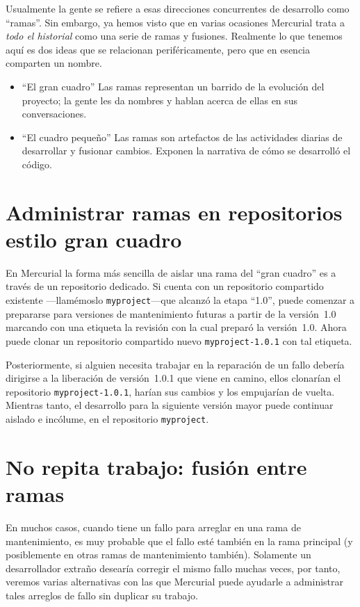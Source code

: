 Usualmente la gente se refiere a esas direcciones
concurrentes de desarrollo como ``ramas''.  Sin embargo, ya hemos visto que
en varias ocasiones Mercurial trata a \emph{todo el historial} como
una serie de ramas y fusiones.  Realmente lo que tenemos aquí es dos
ideas que se relacionan periféricamente, pero que en esencia comparten
un nombre.
\begin{itemize}
\item ``El gran cuadro'' Las ramas representan un barrido de la
  evolución del proyecto; la gente les da nombres y hablan acerca de
  ellas en sus conversaciones.
\item ``El cuadro pequeño'' Las ramas son artefactos de las
  actividades diarias de desarrollar y fusionar cambios. Exponen la
  narrativa de cómo se desarrolló el código.
\end{itemize}

\section{Administrar ramas en repositorios estilo gran cuadro}

En Mercurial la forma más sencilla de aislar una rama del ``gran
cuadro'' es a través de un repositorio dedicado.  Si cuenta con un
repositorio compartido existente ---llamémoslo
\texttt{myproject}---que alcanzó la etapa ``1.0'', puede comenzar a
prepararse para versiones de mantenimiento futuras a partir de la
versión~1.0 marcando con una etiqueta la revisión con la cual preparó la versión~1.0.
Ahora puede clonar un repositorio compartido nuevo
\texttt{myproject-1.0.1} con tal etiqueta.

Posteriormente, si alguien necesita trabajar en la reparación de un
fallo debería dirigirse a la liberación de versión~1.0.1 que viene en
camino, ellos clonarían el repositorio \texttt{myproject-1.0.1},
harían sus cambios y los empujarían de vuelta.
Mientras tanto, el desarrollo para la siguiente versión mayor puede
continuar aislado e incólume, en el repositorio \texttt{myproject}.

\section{No repita trabajo: fusión entre ramas}

En muchos casos, cuando tiene un fallo para arreglar en una rama de
mantenimiento, es muy probable que el fallo esté también en la rama
principal (y posiblemente en otras ramas de mantenimiento
también). Solamente un desarrollador extraño desearía corregir el
mismo fallo muchas veces, por tanto, veremos varias alternativas con
las que Mercurial puede ayudarle a administrar tales arreglos de fallo
sin duplicar su trabajo.


